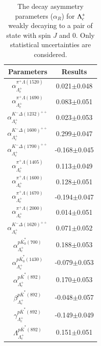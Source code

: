 \begin{table}[h]
    \centering
    \caption{The decay asymmetry parameters ($\alpha_R$) for $\Lambda_{c}^{+}$ weakly decaying to a pair of state with spin $J$ and 0. Only statistical uncertainties are considered.}
    \label{tab:fit_asymmetry}
    \begin{tabular}{cc}
        \hline\hline
    Parameters  & Results \\\hline
    $\alpha_{\Lambda_c^+}^{\pi^{+}\Lambda(1520)}$ & 0.021$\pm$0.048\\
    $\alpha_{\Lambda_c^+}^{\pi^{+}\Lambda(1690)}$ & 0.083$\pm$0.051\\
    $\alpha_{\Lambda_c^+}^{K^{-}\Delta(1232)^{++}}$ & 0.023$\pm$0.053\\
    $\alpha_{\Lambda_c^+}^{K^{-}\Delta(1600)^{++}}$ & 0.299$\pm$0.047\\
    $\alpha_{\Lambda_c^+}^{K^{-}\Delta(1700)^{++}}$ & -0.168$\pm$0.045\\
    $\alpha_{\Lambda_c^+}^{\pi^{+}\Lambda(1405)}$ & 0.113$\pm$0.049\\
    $\alpha_{\Lambda_c^+}^{\pi^{+}\Lambda(1600)}$ & 0.128$\pm$0.051\\
    $\alpha_{\Lambda_c^+}^{\pi^{+}\Lambda(1670)}$ & -0.194$\pm$0.047\\
    $\alpha_{\Lambda_c^+}^{\pi^{+}\Lambda(2000)}$ & 0.014$\pm$0.051\\
    $\alpha_{\Lambda_c^+}^{K^{-}\Delta(1620)^{++}}$ & 0.071$\pm$0.052\\
    $\alpha_{\Lambda_c^+}^{p\overline{K}^*_0(700)}$ & 0.188$\pm$0.053\\
    $\alpha_{\Lambda_c^+}^{p\overline{K}^*_0(1430)}$ & -0.079$\pm$0.053\\
    $\alpha_{\Lambda_c^+}^{p\overline{K}^*(892)}$ & 0.170$\pm$0.053\\
    $\beta_{\Lambda_c^+}^{p\overline{K}^*(892)}$ & -0.048$\pm$0.057\\
    $\gamma_{\Lambda_c^+}^{p\overline{K}^*(892)}$ & -0.149$\pm$0.049\\
    $\Lambda_{\Lambda_c^+}^{p\overline{K}^*(892)}$ & 0.151$\pm$0.051\\
    \hline\hline
    \end{tabular}
\end{table}

\clearpage
